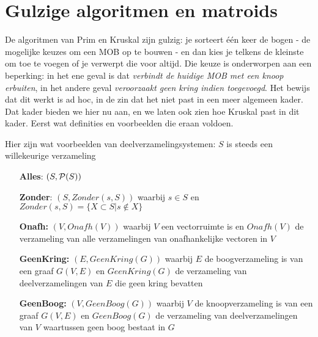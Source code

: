 

\section{Gulzige algoritmen en matroids}\label{matroids}

De algoritmen van Prim en Kruskal zijn gulzig: je sorteert \'{e}\'{e}n
keer de bogen - de mogelijke keuzes om een MOB op te bouwen - en dan
kies je telkens de kleinste om toe te voegen of je verwerpt die voor
altijd. Die keuze is onderworpen aan een beperking: in het ene geval
is dat {\em verbindt de huidige MOB met een knoop erbuiten}, in het
andere geval {\em veroorzaakt geen kring indien toegevoegd}. Het
bewijs dat dit werkt is ad hoc, in de zin dat het niet past in een
meer algemeen kader. Dat kader bieden we hier nu aan, en we laten ook
zien hoe Kruskal past in dit kader. Eerst wat definities en voorbeelden
die eraan voldoen.


Hier zijn wat voorbeelden van deelverzamelingsystemen: $S$ is steeds
een willekeurige verzameling

\begin{itemize}
\item[{\bf Alles}:]
$(S,{\cal P}(S))$

\item[{\bf Zonder}:]
$(S,Zonder(s,S))$ waarbij $s \in S$ en $Zonder(s,S) = \{X \subset S| s \notin X\}$

\item[{\bf Onafh:}]
$(V,Onafh(V))$ waarbij $V$ een vectorruimte is en $Onafh(V)$ de
verzameling van alle verzamelingen van onafhankelijke vectoren in $V$

\item[{\bf GeenKring:}]
$(E,GeenKring(G))$ waarbij $E$ de boogverzameling is van een graaf
$G(V,E)$ en $GeenKring(G)$ de verzameling van deelverzamelingen van
$E$ die geen kring bevatten

\item[{\bf GeenBoog:}]
$(V,GeenBoog(G))$ waarbij $V$ de knoopverzameling is van een graaf
$G(V,E)$ en $GeenBoog(G)$ de verzameling van deelverzamelingen van
$V$ waartussen geen boog bestaat in $G$

\end{itemize}

